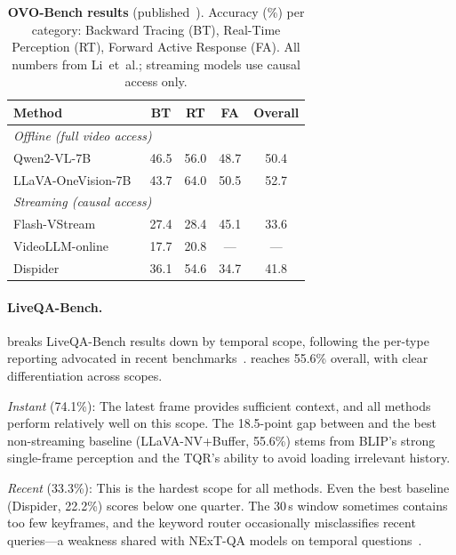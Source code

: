 \begin{table}[t]
  \caption{\textbf{OVO-Bench results} (published~\cite{li2025ovobench}). Accuracy (\%) per category: Backward Tracing (BT), Real-Time Perception (RT), Forward Active Response (FA). All numbers from Li~et~al.; streaming models use causal access only.}
  \label{tab:ovobench}
  \centering
  \small
  \setlength{\tabcolsep}{3pt}
  \begin{tabular}{@{}lcccc@{}}
    \toprule
    Method & BT & RT & FA & Overall \\
    \midrule
    \multicolumn{5}{l}{\textit{Offline (full video access)}} \\
    Qwen2-VL-7B~\cite{wang2024qwen2vl}               & 46.5 & 56.0 & 48.7 & 50.4 \\
    LLaVA-OneVision-7B~\cite{li2024llavaonevision}    & 43.7 & 64.0 & 50.5 & 52.7 \\
    \midrule
    \multicolumn{5}{l}{\textit{Streaming (causal access)}} \\
    Flash-VStream~\cite{zhang2024flashvstream}         & 27.4 & 28.4 & 45.1 & 33.6 \\
    VideoLLM-online~\cite{chen2024videollmonline}      & 17.7 & 20.8 & ---  & ---  \\
    Dispider~\cite{he2024dispider}                     & 36.1 & 54.6 & 34.7 & 41.8 \\
    \bottomrule
  \end{tabular}
\end{table}

\paragraph{LiveQA-Bench.}
 breaks LiveQA-Bench results down by temporal scope, following the per-type reporting advocated in recent benchmarks~\cite{xiao2021nextqa,li2025ovobench}.
\ours reaches 55.6\% overall, with clear differentiation across scopes.

\noindent\textit{Instant} (74.1\%): The latest frame provides sufficient context, and all methods perform relatively well on this scope. The 18.5-point gap between \ours and the best non-streaming baseline (LLaVA-NV+Buffer, 55.6\%) stems from BLIP's strong single-frame perception and the TQR's ability to avoid loading irrelevant history.

\noindent\textit{Recent} (33.3\%): This is the hardest scope for all methods. Even the best baseline (Dispider, 22.2\%) scores below one quarter. The 30\,s window sometimes contains too few keyframes, and the keyword router occasionally misclassifies recent queries---a weakness shared with NExT-QA models on temporal questions~\cite{xiao2021nextqa}.

